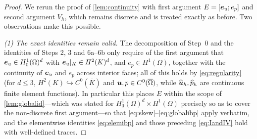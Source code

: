 \begin{proof}
We rerun the proof of \cref{lem:continuity} with first argument $E=[\boldsymbol{e}_{u};e_p]$ and second
argument $V_h$, which remains discrete and is treated exactly as before. Two
observations make this possible.

\smallskip\noindent\emph{(1) The exact identities remain valid.}
The decomposition of Step~0 and the identities of Steps 2, 3 and 6a--6b only require of
the first argument that $\boldsymbol{e}_{u}\in H^1_0(\Omega)^d$ with $\boldsymbol{e}_{u}|_K\in H^2(K)^d$, and
$e_p\in H^1(\Omega)$, together with the continuity of $\boldsymbol{e}_{u}$ and $e_p$ across interior
faces; all of this holds by \eqref{eq:regularity} (for $d\le 3$,
$H^2(K)\hookrightarrow C^0(\overline{K})$ and $\boldsymbol{u},p\in C^0(\overline{\Omega})$, while
$\widehat{\boldsymbol{u}}_h,\widehat{p}_h$ are continuous finite element functions). In particular this places $E$
within the scope of \cref{lem:globalid}---which was stated for $H^1_0(\Omega)^d\times
H^1(\Omega)$ precisely so as to cover the non{\hyp}discrete first argument---so that
\eqref{eq:skew}--\eqref{eq:globalibp} apply verbatim, and the elementwise identities
\eqref{eq:elemibp} and those preceding \eqref{eq:IandIV} hold with well-defined traces.


\end{proof}
